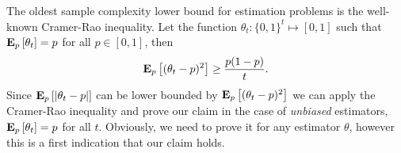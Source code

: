 The oldest sample complexity lower bound for estimation problems
is the well-known Cramer-Rao inequality.
Let the function $\theta_t: \{0,1\}^t \mapsto [0,1]$ such
that $\bm{\mathrm{E}}_{p} \left[ \theta_t \right]=p$ for all $p \in [0,1]$, then
\begin{equation}\label{eq:crlb}
  \bm{\mathrm{E}}_{p} \left[ (\theta_t - p)^2 \right] \geq \frac{p(1-p)}{t}.
\end{equation}
Since $\bm{\mathrm{E}}_{p} \left[ |\theta_t - p| \right]$ can be lower bounded
by $\bm{\mathrm{E}}_{p} \left[ (\theta_t - p)^2 \right]$ we can apply the Cramer-Rao inequality and
prove our claim in the case of \emph{unbiased} estimators, $\bm{\mathrm{E}}_{p} \left[ \theta_t \right]=p$
for all $t$. Obviously, we need to prove it for any estimator $\theta$, however
this is a first indication that our claim holds.


